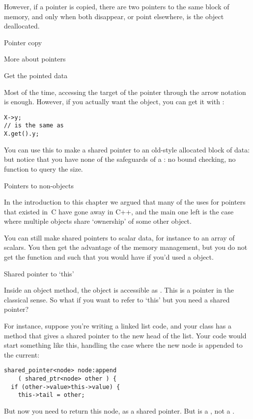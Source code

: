 However, if a pointer is copied, there are two pointers to the same
block of memory, and only when both disappear, or point elsewhere, is
the object deallocated.

\begin{block}{Pointer copy}
  \label{sl:shared-ptr-copy}
\end{block}

 {More about pointers}

 {Get the pointed data}

Most of the time, accessing the target of the pointer through the
arrow notation is enough. However, if you actually want the object,
you can get it with :
\begin{verbatim}
X->y;
// is the same as
X.get().y;
\end{verbatim}

You can use this to make a shared pointer to an old-style allocated
block of data:
%
%
but notice that you have none of the safeguards of a : no
bound checking, no function to query the size.

 {Pointers to non-objects}

In the introduction to this chapter we argued that many of the uses
for pointers that existed in~C have gone away in C++, and the main one
left is the case where multiple objects share `ownership' of some
other object.

You can still make shared pointers to scalar data, for instance to an
array of scalars. You then get the advantage of the memory management,
but you do not get the  function and such that you would have
if you'd used a  object.
%

 {Shared pointer to `this'}

Inside an object method, the object is accessible as
. This is a pointer in the classical sense. So what
if you want to refer to `this' but you need a shared pointer?

For instance, suppose you're writing a linked list code, and your
 class has a method  that gives a shared
pointer to the new head of the list. Your code would start something
like this, handling the case where the new node is appended to the current:
\begin{verbatim}
shared_pointer<node> node:append
    ( shared_ptr<node> other ) {
  if (other->value>this->value) {
    this->tail = other;
\end{verbatim}
But now you need to return this node, as a shared pointer. But
 is a , not a .

